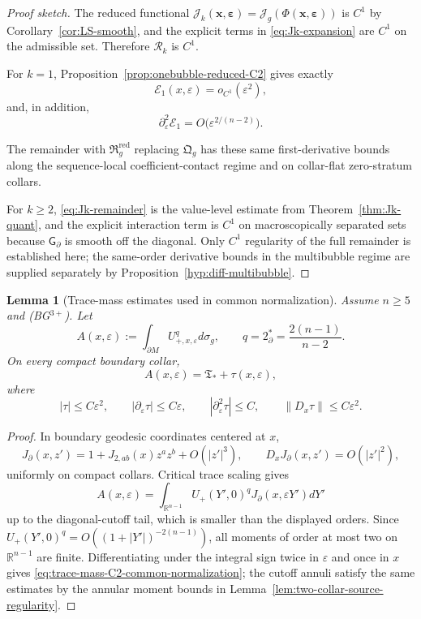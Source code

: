 \documentclass[11pt,reqno,a4paper]{amsart}
\numberwithin{equation}{section}
\theoremstyle{plain}
\newtheorem{lemma}[theorem]{Lemma}
\theoremstyle{remark}
\theoremstyle{plain}
\begin{document}
\begin{proof}[Proof sketch]
The reduced functional $\mathcal J_k(\mathbf x,\boldsymbol\varepsilon)
=\mathcal J_g(\Phi(\mathbf x,\boldsymbol\varepsilon))$
is $C^1$ by Corollary~\ref{cor:LS-smooth}, and the explicit terms in
\eqref{eq:Jk-expansion} are $C^1$ on the admissible set. Therefore $\mathcal R_k$ is $C^1$.

For $k=1$, Proposition~\ref{prop:onebubble-reduced-C2} gives exactly
\[
\mathcal E_1(x,\varepsilon)=o_{C^1}(\varepsilon^2),
\]
and, in addition,
\[
\partial_{\varepsilon}^2\mathcal E_1
=
O\bigl(\varepsilon^{2/(n-2)}\bigr).
\]

The remainder with $\mathfrak R_g^{\mathrm{red}}$ replacing $\mathfrak Q_g$ has these same first-derivative
bounds along the sequence-local coefficient-contact regime and on collar-flat zero-stratum collars.

For $k\ge2$, \eqref{eq:Jk-remainder} is the value-level estimate from
Theorem~\ref{thm:Jk-quant}, and the explicit interaction term is $C^1$ on macroscopically
separated sets because $\mathsf G_\partial$ is smooth off the diagonal.
Only $C^1$ regularity of the full remainder is established here; the same-order derivative
bounds in the multibubble regime are supplied separately by Proposition~\ref{hyp:diff-multibubble}.
\end{proof}


\begin{lemma}[Trace-mass estimates used in common normalization]
\label{lem:trace-mass-C2-common-normalization}
Assume $n\ge5$ and \textup{(BG$^{3+}$)}.  Let
\[
A(x,\varepsilon):=\int_{\partial M}U_{+,x,\varepsilon}^qd\sigma_g,
\qquad
q=2^*_{\partial}=\frac{2(n-1)}{n-2}.
\]
On every compact boundary collar,
\[
A(x,\varepsilon)=\mathfrak T_\ast+\tau(x,\varepsilon),
\]
where
\begin{equation}\label{eq:trace-mass-C2-common-normalization}
|\tau|\le C\varepsilon^2,
\qquad
|\partial_\varepsilon\tau|\le C\varepsilon,
\qquad
|\partial_\varepsilon^2\tau|\le C,
\qquad
\|D_x\tau\|\le C\varepsilon^2 .
\end{equation}
\end{lemma}

\begin{proof}
In boundary geodesic coordinates centered at $x$,
\[
J_\partial(x,z')=1+J_{2,ab}(x)z^az^b+O(|z'|^3),
\qquad
D_xJ_\partial(x,z')=O(|z'|^2),
\]
uniformly on compact collars.  Critical trace scaling gives
\[
A(x,\varepsilon)=
\int_{\mathbb R^{n-1}}U_+(Y',0)^qJ_\partial(x,\varepsilon Y')dY'
\]
up to the diagonal-cutoff tail, which is smaller than the displayed orders.  Since
$U_+(Y',0)^q=O((1+|Y'|)^{-2(n-1)})$, all moments of order at most two on
$\mathbb R^{n-1}$ are finite.  Differentiating under the integral sign twice in $\varepsilon$ and once in
$x$ gives \eqref{eq:trace-mass-C2-common-normalization}; the cutoff annuli satisfy the same estimates by the
annular moment bounds in Lemma~\ref{lem:two-collar-source-regularity}.
\end{proof}
\end{document}
